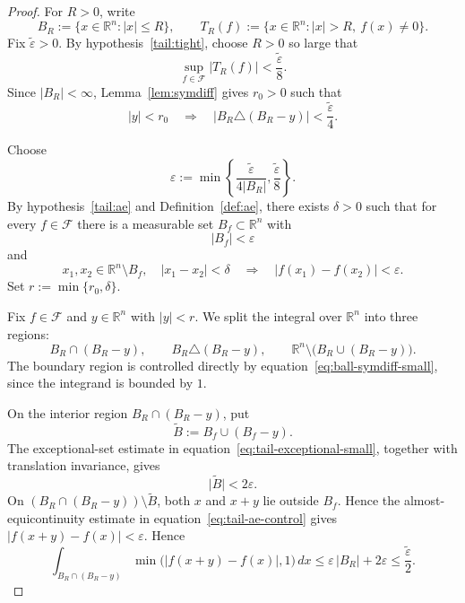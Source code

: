 \documentclass[11pt]{article}
\theoremstyle{plain}
\theoremstyle{definition}
\theoremstyle{remark}
\newcommand{\R}{\mathbb{R}}
\newcommand{\F}{\mathcal{F}}
\newcommand{\eps}{\varepsilon}
\newcommand{\meas}[1]{\lvert #1\rvert}
\begin{document}
\begin{proof}
For $R>0$, write
\[
    B_R:=\{x\in\R^n: |x|\le R\},
    \qquad
    T_R(f):=\{x\in\R^n: |x|>R,\ f(x)\ne0\}.
\]
Fix $\widetilde\eps>0$. By hypothesis~\ref{tail:tight}, choose $R>0$ so
large that
\begin{equation}\label{eq:tail-small}
    \sup_{f\in\F}\meas{T_R(f)}<\frac{\widetilde\eps}{8}.
\end{equation}
Since $\meas{B_R}<\infty$, Lemma~\ref{lem:symdiff} gives $r_0>0$ such that
\begin{equation}\label{eq:ball-symdiff-small}
    |y|<r_0
    \quad\Longrightarrow\quad
    \meas{B_R\triangle(B_R-y)}<\frac{\widetilde\eps}{4}.
\end{equation}

Choose
\[
    \eps:=
    \min\left\{
        \frac{\widetilde\eps}{4\meas{B_R}},
        \frac{\widetilde\eps}{8}
    \right\}.
\]
By hypothesis~\ref{tail:ae} and Definition~\ref{def:ae}, there exists
$\delta>0$ such that for every $f\in\F$ there is a measurable set
$B_f\subset\R^n$ with
\begin{equation}\label{eq:tail-exceptional-small}
    \meas{B_f}<\eps
\end{equation}
and
\begin{equation}\label{eq:tail-ae-control}
    x_1,x_2\in\R^n\setminus B_f,\quad |x_1-x_2|<\delta
    \quad\Longrightarrow\quad
    |f(x_1)-f(x_2)|<\eps .
\end{equation}
Set $r:=\min\{r_0,\delta\}$.

Fix $f\in\F$ and $y\in\R^n$ with $|y|<r$. We split the integral over
$\R^n$ into three regions:
\[
    B_R\cap(B_R-y),\qquad
    B_R\triangle(B_R-y),\qquad
    \R^n\setminus\bigl(B_R\cup(B_R-y)\bigr).
\]
The boundary region is controlled directly by
equation~\eqref{eq:ball-symdiff-small}, since the integrand is bounded by
$1$.

On the interior region $B_R\cap(B_R-y)$, put
\[
    \widetilde B:=B_f\cup(B_f-y).
\]
The exceptional-set estimate in equation~\eqref{eq:tail-exceptional-small},
together with translation invariance, gives
\[
    \meas{\widetilde B}<2\eps .
\]
On $(B_R\cap(B_R-y))\setminus\widetilde B$, both $x$ and $x+y$ lie outside
$B_f$. Hence the almost-equicontinuity estimate in
equation~\eqref{eq:tail-ae-control} gives
$|f(x+y)-f(x)|<\eps$. Hence
\begin{equation}\label{eq:tail-interior}
    \int_{B_R\cap(B_R-y)}
    \min\bigl(|f(x+y)-f(x)|,1\bigr)\,dx
    \le \eps\,\meas{B_R}+2\eps
    \le \frac{\widetilde\eps}{2}.
\end{equation}


\end{proof}
\end{document}
